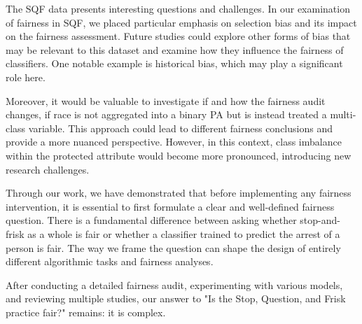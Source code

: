 

The SQF data presents interesting questions and challenges. In our examination of fairness in SQF, we placed particular emphasis on selection bias and its impact on the fairness assessment. Future studies could explore other forms of bias that may be relevant to this dataset and examine how they influence the fairness of classifiers. One notable example is historical bias, which may play a significant role here.\par
Moreover, it would be valuable to investigate if and how the fairness audit changes, if race is not aggregated into a binary PA but is instead treated a multi-class variable. This approach could lead to different fairness conclusions and provide a more nuanced perspective. However, in this context, class imbalance within the protected attribute would become more pronounced, introducing new research challenges.\par
Through our work, we have demonstrated that before implementing any fairness intervention, it is essential to first formulate a clear and well-defined fairness question. There is a fundamental difference between asking whether stop-and-frisk as a whole is fair or whether a classifier trained to predict the arrest of a person is fair.
The way we frame the question can shape the design of entirely different algorithmic tasks and fairness analyses.\par
After conducting a detailed fairness audit, experimenting with various models, and reviewing multiple studies, our answer to "Is the Stop, Question, and Frisk practice fair?" remains: it is complex.


